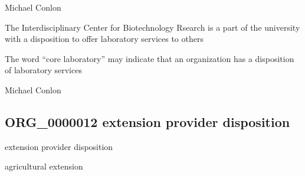 \documentclass[letterpaper,10pt,english]{sphinxmanual}
\begin{document}
\begin{sphinxShadowBox}

\sphinxAtStartPar
Michael Conlon 
\end{sphinxShadowBox}

\begin{sphinxShadowBox}

\sphinxAtStartPar
The Interdisciplinary Center for Biotechnology Rsearch is a part of the university with a disposition to offer laboratory services to others
\end{sphinxShadowBox}

\begin{sphinxShadowBox}

\sphinxAtStartPar
The word “core laboratory” may indicate that an organization has a disposition of laboratory services
\end{sphinxShadowBox}

\begin{sphinxShadowBox}

\sphinxAtStartPar
Michael Conlon 
\end{sphinxShadowBox}
\begin{quote}

\ignorespaces \end{quote}


\subsection{ORG\_0000012 \sphinxhyphen{} extension provider disposition}
\label{\detokenize{doc-ORG_0000012:org-0000012-extension-provider-disposition}}\label{\detokenize{doc-ORG_0000012:index-0}}\label{\detokenize{doc-ORG_0000012::doc}}
\begin{sphinxShadowBox}

\sphinxAtStartPar
extension provider disposition
\end{sphinxShadowBox}

\begin{sphinxShadowBox}

\sphinxAtStartPar
agricultural extension
\end{sphinxShadowBox}
\end{document}
